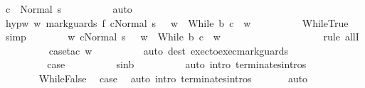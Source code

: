 \begin{isabellebody}
\ {\isachardoublequoteopen}{\isasymGamma}{\isasymturnstile}c\ {\isasymdown}\ Normal\ s{\isachardoublequoteclose}\isanewline
\ \ \ \ \ \ \ \ \isamarkupfalse%
\ auto\isanewline
\ \ \ \ \ \ \isamarkupfalse%
\isanewline
\ \ \ \ \ \ \isamarkupfalse%
\ hyp{\isacharunderscore}w{\isacharcolon}\ {\isachardoublequoteopen}{\isasymforall}w{\isachardot}\ {\isasymGamma}{\isasymturnstile}{\isasymlangle}mark{\isacharunderscore}guards\ f\ c{\isacharcomma}Normal\ s\ {\isasymrangle}\ {\isasymRightarrow}\ w\ {\isasymlongrightarrow}\ {\isasymGamma}{\isasymturnstile}While\ b\ c\ {\isasymdown}\ w{\isachardoublequoteclose}\isanewline
\ \ \ \ \ \ \ \ \isamarkupfalse%
\ WhileTrue\ \isamarkupfalse%
\ simp\isanewline
\ \ \ \ \ \ \isamarkupfalse%
\ {\isachardoublequoteopen}{\isasymforall}w{\isachardot}\ {\isasymGamma}{\isasymturnstile}{\isasymlangle}c{\isacharcomma}Normal\ s\ {\isasymrangle}\ {\isasymRightarrow}\ w\ {\isasymlongrightarrow}\ {\isasymGamma}{\isasymturnstile}While\ b\ c\ {\isasymdown}\ w{\isachardoublequoteclose}\isanewline
\ \ \ \ \ \ \ \ \isamarkupfalse%
\ {\isacharminus}\isanewline
\ \ \ \ \ \ \ \ \isamarkupfalse%
\ {\isacharparenleft}rule\ allI{\isacharparenright}\isanewline
\ \ \ \ \ \ \ \ \isamarkupfalse%
\ {\isacharparenleft}case{\isacharunderscore}tac\ {\isachardoublequoteopen}w{\isachardoublequoteclose}{\isacharparenright}\isanewline
\ \ \ \ \ \ \ \ \isamarkupfalse%
\ {\isacharparenleft}auto\ dest{\isacharcolon}\ exec{\isacharunderscore}to{\isacharunderscore}exec{\isacharunderscore}mark{\isacharunderscore}guards{\isacharparenright}\isanewline
\ \ \ \ \ \ \ \ \isamarkupfalse%
\isanewline
\ \ \ \ \ \ \isamarkupfalse%
\ \isamarkupfalse%
\ {\isacharquery}case\isanewline
\ \ \ \ \ \ \ \ \isamarkupfalse%
\ s{\isacharunderscore}in{\isacharunderscore}b\isanewline
\ \ \ \ \ \ \ \ \isamarkupfalse%
\ {\isacharparenleft}auto\ intro{\isacharcolon}\ terminates{\isachardot}intros{\isacharparenright}\isanewline
\ \ \ \ \isamarkupfalse%
\isanewline
\ \ \ \ \ \ \isamarkupfalse%
\ WhileFalse\ \isamarkupfalse%
\ {\isacharquery}case\ \isamarkupfalse%
\ {\isacharparenleft}auto\ intro{\isacharcolon}\ terminates{\isachardot}intros{\isacharparenright}\ \isanewline
\ \ \ \ \isamarkupfalse%
\ auto\isanewline
\ \ \isacommand{{\isacharbraceright}}\isamarkupfalse%

\end{isabellebody}
